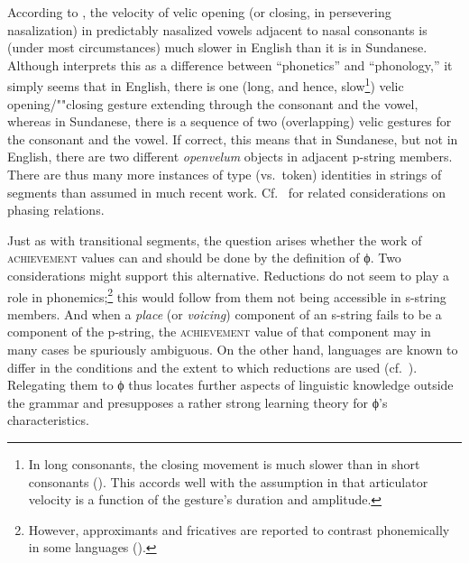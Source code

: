 \documentclass[output=paper]{langsci/langscibook}
\begin{document}
According to \cite{cohn:93}, the velocity of velic
opening (or closing, in persevering nasalization) in predictably nasalized
vowels adjacent to nasal consonants is (under most circumstances) much
slower in English than it is in Sundanese. Although
\cite{cohn:93} interprets this as a difference
between ``phonetics'' and ``phonology,'' it simply seems that in English,
there is one (long, and hence, slow\footnote{%
	In long consonants, the
  closing movement is much slower than in short consonants
  (\citealt[217\hspace{1pt}ff.\@]{smit:95}). This
  accords well with the assumption
  in \cite[222]{krog:93} that
  articulator velocity is a function of the gesture's duration and
  amplitude.%
}) velic opening/""closing gesture extending through the
consonant and the vowel, whereas in Sundanese, there is a sequence of two
(overlapping) velic gestures for the consonant and the vowel. If correct,
this means that in Sundanese, but not in English, there are two different
\textit{openvelum}\/ objects in adjacent p-string members.  There are thus
many more instances of type (vs.\ token) identities in strings of segments
than assumed in much recent work.
Cf.\ \cite[362--365]{sal:mun:89} for related considerations on phasing relations.  %

Just as with transitional segments, the question arises whether the work of
\textsc{achievement} values can and should be done by the definition of
ϕ. Two considerations might support this alternative.  Reductions do
not seem to play a role in phonemics;\footnote{However, approximants and
  fricatives are reported to contrast phonemically in some languages
  (\citealt[76 and 324]{lad:mad:96}).%
}
this would follow from them not being accessible in s-string
members. And when a \textit{place}\/ (or \textit{voicing}\/) component of an
s-string fails to be a component of the p-string, the \textsc{achievement}
value of that component may in many cases be spuriously ambiguous. On the
other hand, languages are known to differ in the conditions and the extent
to which reductions are used (cf.\ \citealt{jun:96}).
Relegating them to ϕ thus locates further aspects of linguistic
knowledge outside the grammar and presupposes a rather strong learning
theory for ϕ's characteristics.
\end{document}
